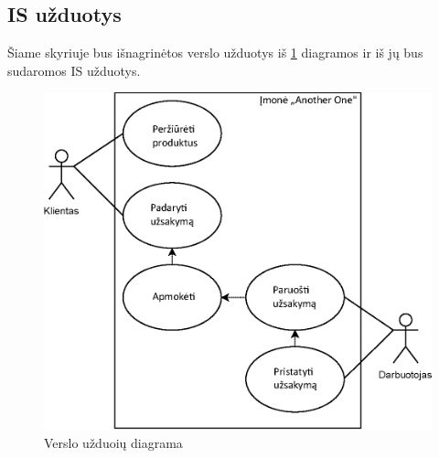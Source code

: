 \documentclass{VUMIFPSkursinis}
\begin{document}
\subsection{IS užduotys}
Šiame skyriuje bus išnagrinėtos verslo užduotys iš \ref{img:UC} diagramos ir iš jų bus sudaromos IS užduotys.
\begin{figure}[H]
    \centering
    \includegraphics[scale=1]{img/UseCase}
    \caption{Verslo užduoių diagrama}
    \label{img:UC}
\end{figure}
\end{document}
